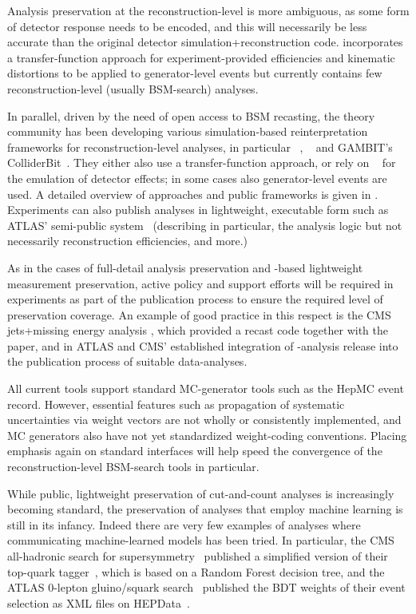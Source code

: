 \documentclass[11pt]{article}
\begin{document}
Analysis preservation at the reconstruction-level is more ambiguous, as some form of detector response needs to be encoded, and this will necessarily be less accurate than the original detector simulation+reconstruction code.
\rivet incorporates a transfer-function approach for experiment-provided efficiencies and kinematic distortions to be applied to generator-level events but currently contains few reconstruction-level (usually BSM-search) analyses.

In parallel, driven by the need of open access to BSM recasting, the theory community has been developing various simulation-based reinterpretation frameworks for reconstruction-level analyses, in particular \checkmate~\cite{Drees:2013wra,Dercks:2016npn}, \madanalysis~\cite{Dumont:2014tja,Conte:2018vmg} and GAMBIT's ColliderBit~\cite{GAMBIT:2017qxg}. They either also use a transfer-function approach, or rely on \delphes~\cite{deFavereau:2013fsa} for the emulation of detector effects; in some cases also generator-level events are used. A detailed overview of approaches and public frameworks is given in \cite{LHCReinterpretationForum:2020xtr}.
%
Experiments can also publish analyses in lightweight, executable form such as ATLAS' semi-public \simpleanalysis system~\cite{atlas:simpleanalysis} 
(describing in particular, the analysis logic but not necessarily reconstruction efficiencies, and more.)

As in the cases of full-detail analysis preservation and \rivet-based lightweight measurement preservation, active policy and support efforts will be required in experiments as part of the publication process to ensure the required level of preservation coverage. An example of good practice in this respect is the CMS jets+missing energy analysis \cite{CMS:2021far}, which provided a \madanalysis recast code \cite{Albert:2774586,DVN/IRF7ZL_2021} together with the paper, and in ATLAS and CMS' established integration of \rivet-analysis release into the publication process of suitable data-analyses.

All current tools support standard MC-generator tools such as the HepMC event record. However, essential features such as propagation of systematic uncertainties via weight vectors are not wholly or consistently implemented, and MC generators also have not yet standardized weight-coding conventions. Placing emphasis again on standard interfaces will help speed the convergence of the reconstruction-level BSM-search tools in particular.

While public, lightweight preservation of cut-and-count analyses is increasingly becoming standard, the preservation of analyses that employ machine learning is still in its infancy. 
Indeed there are very few examples of analyses where communicating machine-learned models has been tried. In particular, the CMS all-hadronic search for supersymmetry~\cite{CMS:2017qxu} published a simplified version of their top-quark tagger~\cite{cms:toptagger}, which is based on a Random Forest decision tree, and the ATLAS 0-lepton gluino/squark search~\cite{ATLAS:2020syg,Uno:2763449} published the BDT weights of their event selection as XML files on HEPData~\cite{hepdata.95664.v2/r8}.  
\end{document}
